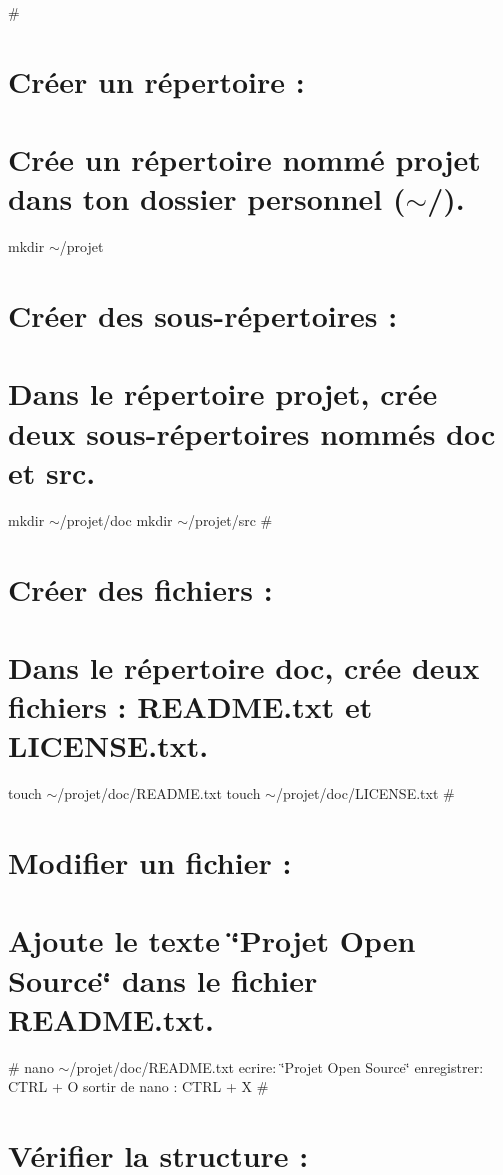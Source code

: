 \# \section*{Créer un répertoire \+:}

\section*{Crée un répertoire nommé projet dans ton dossier personnel ($\sim$/).}

mkdir $\sim$/projet \section*{Créer des sous-\/répertoires \+:}

\section*{Dans le répertoire projet, crée deux sous-\/répertoires nommés doc et src.}

mkdir $\sim$/projet/doc mkdir $\sim$/projet/src \# \section*{Créer des fichiers \+:}

\section*{Dans le répertoire doc, crée deux fichiers \+: R\+E\+A\+D\+M\+E.\+txt et L\+I\+C\+E\+N\+S\+E.\+txt.}

touch $\sim$/projet/doc/\+R\+E\+A\+D\+ME.txt touch $\sim$/projet/doc/\+L\+I\+C\+E\+N\+SE.txt \# \section*{Modifier un fichier \+:}

\section*{Ajoute le texte \char`\"{}\+Projet Open Source\char`\"{} dans le fichier R\+E\+A\+D\+M\+E.\+txt.}

\# nano $\sim$/projet/doc/\+R\+E\+A\+D\+ME.txt ecrire\+: \char`\"{}\+Projet Open Source\char`\"{} enregistrer\+: C\+T\+RL + O sortir de nano \+: C\+T\+RL + X \# \section*{Vérifier la structure \+:}

